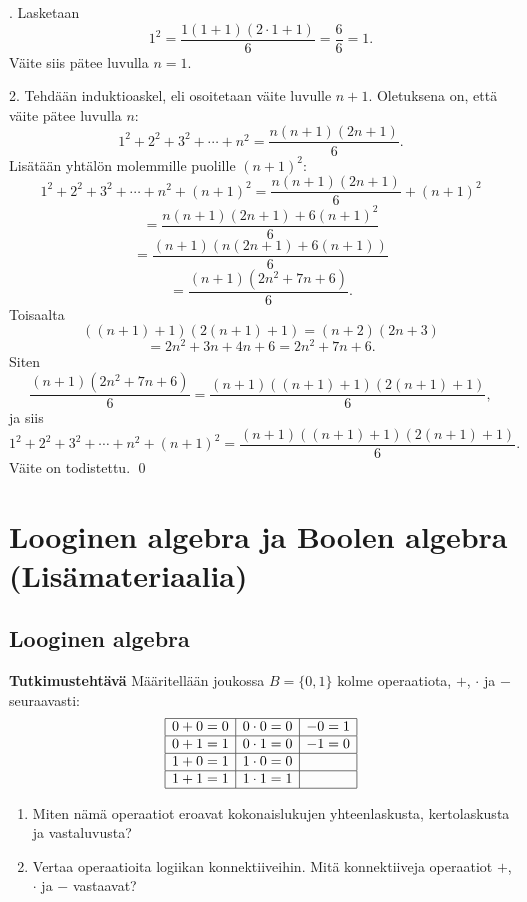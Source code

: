 . Lasketaan
\[
1^2 = \frac{1(1+1)(2\cdot 1 +1)}{6} = \frac{6}{6}=1.
\]
Väite siis pätee luvulla $n=1$.

2. Tehdään induktioaskel, eli osoitetaan väite luvulle $n+1$. Oletuksena on, että väite pätee luvulla $n$:
\[
1^2+2^2+3^2 + \cdots + n^2 = \frac{n(n+1)(2n+1)}{6}.
\]
Lisätään yhtälön molemmille puolille $(n+1)^2$:
\[
1^2+2^2+3^2 + \cdots + n^2+ (n+1)^2 = \frac{n(n+1)(2n+1)}{6}+(n+1)^2
\]
\[
= \frac{n(n+1)(2n+1)+6(n+1)^2}{6}
\]
\[
= 
\frac{(n+1)(n(2n+1)+6(n+1))}{6}
\]
\[
=
\frac{(n+1)(2n^2+7n+6)}{6}.
\]
Toisaalta
\[
((n+1)+1)(2(n+1)+1)=(n+2)(2n+3)
\]
\[
=2n^2+3n+4n+6=2n^2+7n+6.
\]
Siten 
\[
\frac{(n+1)(2n^2+7n+6)}{6}
= \frac{(n+1)((n+1)+1)(2(n+1)+1)}{6},
\]
ja siis
\[
1^2+2^2+3^2 + \cdots + n^2+ (n+1)^2 %
= \frac{(n+1)((n+1)+1)(2(n+1)+1)}{6}.
\]
Väite on todistettu.
\qed

\newpage


\chapter{Looginen algebra ja Boolen algebra (Lisämateriaalia)}

\section{Looginen algebra}

{\bf Tutkimustehtävä}
Määritellään joukossa $B=\{0,1\}$ kolme operaatiota, $+$, $\cdot$ ja $-$ seuraavasti:
\[
\begin{array}{|c|c|c|}
\hline
0+0=0 & 0\cdot0=0 & - 0=1\\
\hline
0+1=1 & 0\cdot1=0 & - 1=0\\
\hline
1+0=1 & 1\cdot0=0 & \\
\hline
1+1=1 & 1\cdot1=1 & \\
\hline

\end{array}
\]
\begin{enumerate}
\item Miten nämä operaatiot eroavat kokonaislukujen yhteenlaskusta, kertolaskusta ja vastaluvusta?
\item Vertaa operaatioita logiikan konnektiiveihin. Mitä konnektiiveja operaatiot $+$, $\cdot$ ja $-$ vastaavat?
\end{enumerate}


